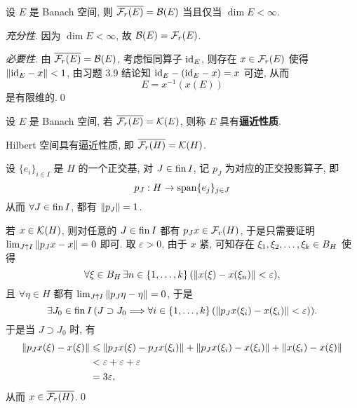 	\begin{Proposition}
		设 $ E $ 是 Banach 空间, 则 $ \baro{\Fr(E)}=\CB(E) $ 当且仅当 $ \dim E<\infty $.
	\end{Proposition}
	\begin{Proof}
		\textsl{充分性}. 因为 $ \dim E<\infty $, 故 $ \CB(E)=\Fr(E) $.

		\textsl{必要性}. 由 $ \baro{\Fr(E)}=\CB(E) $, 考虑恒同算子 $ \id_{E} $, 则存在 $ x\in\Fr(E) $ 使得 $ \norm{\id_{E}-x}<1 $, 由习题 3.9 结论知 $ \id_{E}-(\id_{E}-x)=x $ 可逆, 从而
		\[
			E = x^{-1}(x(E))
		\]
		是有限维的.\qed
	\end{Proof}

	\begin{Definition}[逼近性质]\label{def:逼近性质}
		设 $ E $ 是 Banach 空间, 若 $ \baro{\Fr(E)}=\CK(E) $, 则称 $ E $ 具有\textbf{逼近性质}.
	\end{Definition}

	\begin{Proposition}
        Hilbert 空间具有逼近性质, 即 $ \baro{\Fr(H)}=\CK(H) $.
    \end{Proposition}
    \begin{Proof}
        设 $ \{e_i\}_{i\in I} $ 是 $ H $ 的一个正交基, 对 $ J\in\fin I $, 记 $ p_J $ 为对应的正交投影算子, 即
        \[
            p_J : H\to\Span\{e_j\}_{j\in J}
        \]
        从而 $ \forall J\in\fin I $, 都有 $ \norm{p_J}=1 $.

        若 $ x\in\CK(H) $, 则对任意的 $ J\in\fin I $ 都有 $ p_Jx\in\Fr(H) $, 于是只需要证明 $ \lim_{J\uparrow I}\norm{p_Jx-x}=0 $ 即可. 取 $ \varepsilon>0 $, 由于 $ x $ 紧, 可知存在 $ \seq[k]{\xi}\in B_H $ 使得
        \[
            \forall\xi\in B_H\,\exists n\in\{1,\dots,k\}\,(\norm{x(\xi)-x(\xi_n)}<\varepsilon),
        \]
        且 $ \forall\eta\in H $ 都有 $ \lim_{J\uparrow I}\norm{p_J\eta-\eta}=0 $, 于是
        \[
            \exists J_0\in\fin I\,(J\supset J_0\Longrightarrow\forall i\in\{1,\dots,k\}\,(\norm{p_Jx(\xi_i)-x(\xi_i)}<\varepsilon)).
        \]
        于是当 $ J\supset J_0 $ 时, 有
        \[
            \begin{aligned}
                \norm{p_Jx(\xi)-x(\xi)}&\leqslant\norm{p_Jx(\xi)-p_Jx(\xi_i)}+\norm{p_Jx(\xi_i)-x(\xi_i)}+\norm{x(\xi_i)-x(\xi)}\\
                &<\varepsilon+\varepsilon+\varepsilon\\
                &=3\varepsilon,
            \end{aligned}
        \]
        从而 $ x\in\baro{\Fr(H)} $.\qed
	\end{Proof}
	

